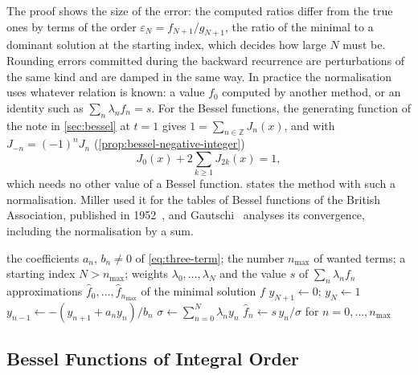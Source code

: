 The proof shows the size of the error: the computed ratios differ from the true ones by terms of the order $\varepsilon_N=f_{N+1}/g_{N+1}$, the ratio of the minimal to a dominant solution at the starting index, which decides how large $N$ must be. Rounding errors committed during the backward recurrence are perturbations of the same kind and are damped in the same way. In practice the normalisation uses whatever relation is known: a value $f_0$ computed by another method, or an identity such as $\sum_n\lambda_nf_n=s$. For the Bessel functions, the generating function of the note in \cref{sec:bessel} at $t=1$ gives $1=\sum_{n\in\mathbb Z}J_n(x)$, and with $J_{-n}=(-1)^nJ_n$ (\cref{prop:bessel-negative-integer})
\begin{equation}
J_0(x)+2\sum_{k\ge1}J_{2k}(x)=1 ,
\label{eq:bessel-normalisation}
\end{equation}
which needs no other value of a Bessel function.  states the method with such a normalisation. Miller used it for the tables of Bessel functions of the British Association, published in 1952~\cite[Sect.~3.6]{olver2010nist}, and Gautschi~\cite{gautschi1967} analyses its convergence, including the normalisation by a sum.

\begin{algorithm}
\begin{algorithmic}[1]
\Require the coefficients $a_n$, $b_n\ne0$ of \eqref{eq:three-term}; the number $n_{\max}$ of wanted terms; a starting index $N>n_{\max}$; weights $\lambda_0,\ldots,\lambda_N$ and the value $s$ of $\sum_n\lambda_nf_n$
\Ensure approximations $\hat f_0,\ldots,\hat f_{n_{\max}}$ of the minimal solution $f$
\State $y_{N+1}\gets0$; $y_N\gets1$
  \State $y_{n-1}\gets-(y_{n+1}+a_ny_n)/b_n$ 
\EndFor
\State $\sigma\gets\sum_{n=0}^N\lambda_ny_n$
\State \Return $\hat f_n\gets s\,y_n/\sigma$ for $n=0,\ldots,n_{\max}$
\end{algorithmic}
\caption{Miller's backward recurrence for the minimal solution of a three-term recurrence. The start $y_N=1$ may need to be replaced by a small number, or the $y_n$ rescaled during the loop, to avoid overflow. For the Bessel functions $J_n(x)$, $a_n=-2n/x$, $b_n=1$, $\lambda_0=1$, $\lambda_{2k}=2$, $\lambda_{2k+1}=0$ and $s=1$, by \eqref{eq:bessel-normalisation}.\label{alg:miller}}
\end{algorithm}

\subsection{Bessel Functions of Integral Order}

